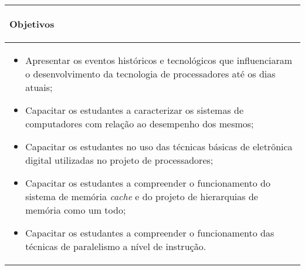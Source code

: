 \hspace{1cm}
\begin{table}[h]
\centering
\begin{small} 
\setlength{\tabcolsep}{3pt} 
\begin{tabular}{|p{15cm}|}\hline

\begin{center}\textbf{Objetivos}\end{center}\\ \hline
\begin{itemize}

\item Apresentar os eventos históricos e tecnológicos que influenciaram o desenvolvimento da tecnologia de processadores até os dias atuais;
\item Capacitar os estudantes a caracterizar os sistemas de computadores com relação ao desempenho dos mesmos;
\item Capacitar os estudantes no uso das técnicas básicas de eletrônica digital utilizadas no projeto de processadores;
\item Capacitar os estudantes a compreender o funcionamento do sistema de memória \textit{cache} e do projeto de hierarquias de memória como um todo;
\item Capacitar os estudantes a compreender o funcionamento das técnicas de paralelismo a nível de instrução.

\end{itemize}
\\ \hline

\end{tabular} 
\end{small}
\end{table}

